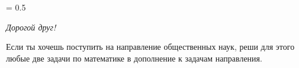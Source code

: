 \documentclass{article}
\newcommand{\Е}{{\fontencoding{X2}\selectfont\CYRYAT}} %
\newcommand{\е}{{\fontencoding{X2}\selectfont\cyryat}} %
\begin{document}
\setdefaultleftmargin{21pt}{2.5em}{2.5em}{}{}{}
\plparsep = 0.5\baselineskip


\newpage
{}

\vspace{2\baselineskip}



\vspace{2\baselineskip}



\vspace{2\baselineskip}




\newpage
{}

\vspace{2\baselineskip}



\vspace{2\baselineskip}



\vspace{1\baselineskip}




\newpage
{}


\vspace{1\baselineskip}

\rule{0pt}{0pt}\hfill\parbox[t]{0.923\textwidth}{
{\it\small
\parskip=6pt\parindent=0pt
\noindent Дорогой друг!%

Если ты хочешь поступить на направление общественных наук, реши для этого любые две задачи по математике в дополнение к задачам направления.
}
}
\end{document}
